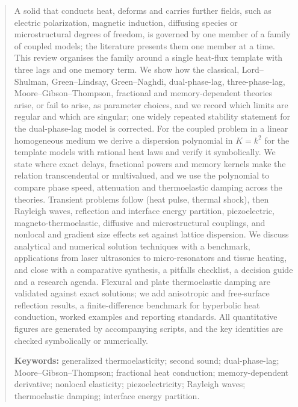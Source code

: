 \begin{abstract}
A solid that conducts heat, deforms and carries further fields, such as electric polarization, magnetic induction, diffusing species or microstructural degrees of freedom, is governed by one member of a family of coupled models; the literature presents them one member at a time. This review organises the family around a single heat-flux template with three lags and one memory term. We show how the classical, Lord--Shulman, Green--Lindsay, Green--Naghdi, dual-phase-lag, three-phase-lag, Moore--Gibson--Thompson, fractional and memory-dependent theories arise, or fail to arise, as parameter choices, and we record which limits are regular and which are singular; one widely repeated stability statement for the dual-phase-lag model is corrected. For the coupled problem in a linear homogeneous medium we derive a dispersion polynomial in $K=k^2$ for the template models with rational heat laws and verify it symbolically. We state where exact delays, fractional powers and memory kernels make the relation transcendental or multivalued, and we use the polynomial to compare phase speed, attenuation and thermoelastic damping across the theories. Transient problems follow (heat pulse, thermal shock), then Rayleigh waves, reflection and interface energy partition, piezoelectric, magneto-thermoelastic, diffusive and microstructural couplings, and nonlocal and gradient size effects set against lattice dispersion. We discuss analytical and numerical solution techniques with a benchmark, applications from laser ultrasonics to micro-resonators and tissue heating, and close with a comparative synthesis, a pitfalls checklist, a decision guide and a research agenda. Flexural and plate thermoelastic damping are validated against exact solutions; we add anisotropic and free-surface reflection results, a finite-difference benchmark for hyperbolic heat conduction, worked examples and reporting standards. All quantitative figures are generated by accompanying scripts, and the key identities are checked symbolically or numerically.
\medskip

\noindent\textbf{Keywords:} generalized thermoelasticity; second sound; dual-phase-lag; Moore--Gibson--Thompson; fractional heat conduction; memory-dependent derivative; nonlocal elasticity; piezoelectricity; Rayleigh waves; thermoelastic damping; interface energy partition.
\end{abstract}
